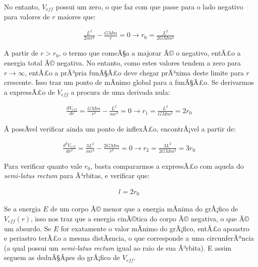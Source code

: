 No entanto, $V_{eff}$ possui um zero, o que faz com que passe para o lado negativo para valores de $r$ maiores que:

\begin{eqnarray}
	\frac{L^2}{2mr^2} - \frac{GMm}{r} = 0 \rightarrow r_0 = \frac{L^2}{2GMm^2}	\label{eq58}
\end{eqnarray} 

A partir de $r > r_0$, o termo que comeÃ§a a majorar Ã© o negativo, entÃ£o a energia total Ã© negativa. No entanto, como estes valores tendem a zero para $r \rightarrow \infty$, entÃ£o a prÃ³pria funÃ§Ã£o deve chegar prÃ³xima deste limite para $r$ crescente. Isso traz um ponto de mÃ­nimo global para a funÃ§Ã£o. Se derivarmos a expressÃ£o de $V_{eff}$ a procura de uma derivada nula:

\begin{eqnarray}
	\frac{dV_{eff}}{dr} = \frac{GMm}{r^2} -\frac{L^2}{mr^3} = 0 \rightarrow r_1 = \frac{L^2}{GMm^2} = 2r_0	\label{eq59}
\end{eqnarray} 

Ã possÃ­vel verificar ainda um ponto de inflexÃ£o, encontrÃ¡vel a partir de:

\begin{eqnarray}
	\frac{d^2V_{eff}}{dr^2} = \frac{3L^2}{mr^4} - \frac{2GMm}{r^3}  = 0 \rightarrow r_2 = \frac{3L^2}{2GMm^2} = 3r_0	\label{eq60}
\end{eqnarray}

Para verificar quanto vale $r_0$, basta compararmos a expressÃ£o com aquela do \textit{semi-latus rectum} para Ã³rbitas, e verificar que:

\begin{eqnarray}
	l = 2r_0	\label{eq61}
\end{eqnarray}

Se a energia $E$ de um corpo Ã© menor que a energia mÃ­nima do grÃ¡fico de $V_{eff}(r)$, isso nos traz que a energia cinÃ©tica do corpo Ã© negativa, o que Ã© um absurdo. Se $E$ for exatamente o valor mÃ­nimo do grÃ¡fico, entÃ£o apoastro e periastro terÃ£o a mesma distÃ¢ncia, o que corresponde a uma circunferÃªncia (a qual possui um \textit{semi-latus rectum} igual ao raio de sua Ã³rbita). E assim seguem as deduÃ§Ãµes do grÃ¡fico de $V_{eff}$.

